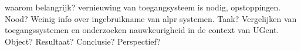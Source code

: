 
%
%


\chapter*{}

waarom belangrijk? vernieuwing van toegangsysteem is nodig, opstoppingen.
Nood? Weinig info over ingebruikname van alpr systemen.
Taak? Vergelijken van toegangssystemen en onderzoeken nauwkeurigheid in de context van UGent.
Object?
Resultaat?
Conclusie?
Perspectief?

